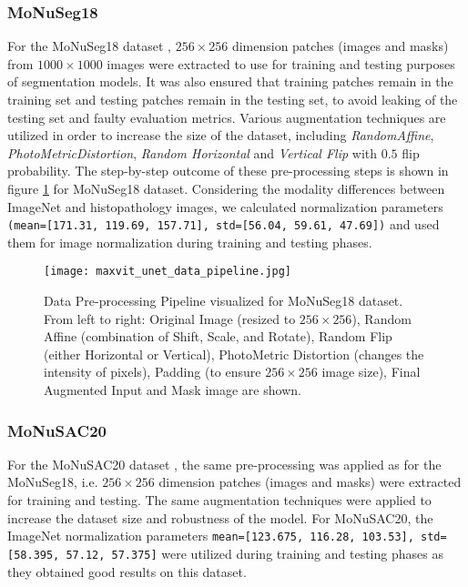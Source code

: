 \documentclass{article}
\begin{document}
\subsubsection{MoNuSeg18}

For the MoNuSeg18 dataset \cite{kumar2019multi}, \(256 \times 256\) dimension patches (images and masks) from \(1000 \times 1000\) images were extracted to use for training and testing purposes of segmentation models. It was also ensured that training patches remain in the training set and testing patches remain in the testing set, to avoid leaking of the testing set and faulty evaluation metrics. Various augmentation techniques are utilized in order to increase the size of the dataset, including \textit{RandomAffine}, \textit{PhotoMetricDistortion}, \textit{Random Horizontal} and \textit{Vertical Flip} with \(0.5\) flip probability. The step-by-step outcome of these pre-processing steps is shown in figure \ref{fig:data-pipeline} for MoNuSeg18 \cite{kumar2019multi} dataset. Considering the modality differences between ImageNet and histopathology images, we calculated normalization parameters \texttt{(mean=[171.31, 119.69, 157.71], std=[56.04, 59.61, 47.69])} and used them for image normalization during training and testing phases.

\begin{figure}[ht!]
    \centering
    \texttt{[image: maxvit\_unet\_data\_pipeline.jpg]}
    \caption{Data Pre-processing Pipeline visualized for MoNuSeg18 dataset. From left to right: Original Image (resized to \(256 \times 256\)), Random Affine (combination of Shift, Scale, and Rotate), Random Flip (either Horizontal or Vertical), PhotoMetric Distortion (changes the intensity of pixels), Padding (to ensure \(256 \times 256\) image size), Final Augmented Input and Mask image are shown.}
    \label{fig:data-pipeline}
\end{figure}

\subsubsection{MoNuSAC20}

For the MoNuSAC20 dataset \cite{verma2021monusac2020}, the same pre-processing was applied as for the MoNuSeg18, i.e. \(256 \times 256\) dimension patches (images and masks) were extracted for training and testing. The same augmentation techniques were applied to increase the dataset size and robustness of the model. For MoNuSAC20, the ImageNet normalization parameters \texttt{mean=[123.675, 116.28, 103.53], std=[58.395, 57.12, 57.375]} were utilized during training and testing phases as they obtained good results on this dataset.
\end{document}
